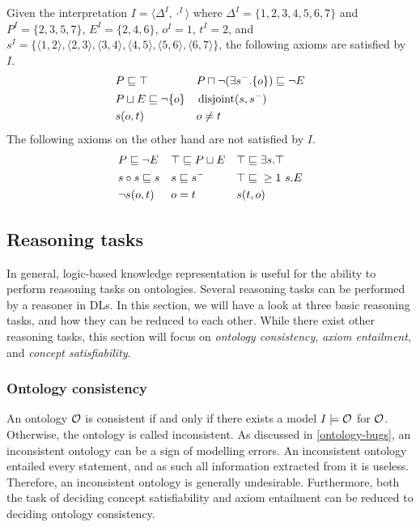 \begin{example}
  Given the interpretation $I = \langle \Delta^I, \cdot^I \rangle$ where $\Delta^I = \{ 1, 2, 3, 4, 5, 6, 7 \}$ and $P^I = \{ 2, 3, 5, 7 \}$, $E^I = \{ 2, 4, 6 \}$, $o^I = 1$, $t^I = 2$, and $s^I = \{ \langle 1, 2 \rangle,\allowbreak \langle 2, 3 \rangle,\allowbreak \langle 3, 4 \rangle,\allowbreak \langle 4, 5 \rangle,\allowbreak \langle 5, 6 \rangle,\allowbreak \langle 6, 7 \rangle \}$, the following axioms are satisfied by $I$.
  \begin{align*}
    &P \sqsubseteq \top &
    &P \sqcap \lnot (\exists s^-.\{o\}) \sqsubseteq \lnot E \\
    &P \sqcup E \sqsubseteq \lnot \{o\} &
    &\operatorname{disjoint}(s, s^-) \\
    &s(o, t) &
    &o \not= t
  \end{align*}
  The following axioms on the other hand are not satisfied by $I$.
  \begin{align*}
    &P \sqsubseteq \lnot E &
    &\top \sqsubseteq P \sqcup E &
    &\top \sqsubseteq \exists s.\top \\
    &s \circ s \sqsubseteq s &
    &s \sqsubseteq s^- &
    &\top \sqsubseteq{} \geq 1~s.E \\
    &\lnot s(o, t) &
    &o = t &
    &s(t, o)
  \end{align*}
\end{example}

\subsection{Reasoning tasks} \label{reasoning-tasks}

In general, logic-based knowledge representation is useful for the ability to perform reasoning tasks on ontologies. Several reasoning tasks can be performed by a reasoner in DLs. In this section, we will have a look at three basic reasoning tasks, and how they can be reduced to each other. While there exist other reasoning tasks, this section will focus on \emph{ontology consistency}, \emph{axiom entailment}, and \emph{concept satisfiability}.

\subsubsection{Ontology consistency} \label{knowledge-base-satisfiability}

An ontology $\mathcal{O}$ is consistent if and only if there exists a model $I \models \mathcal{O}$ for $\mathcal{O}$. Otherwise, the ontology is called inconsistent. As discussed in \cref{ontology-bugs}, an inconsistent ontology can be a sign of modelling errors. An inconsistent ontology entailed every statement, and as such all information extracted from it is useless. Therefore, an inconsistent ontology is generally undesirable. Furthermore, both the task of deciding concept satisfiability and axiom entailment can be reduced to deciding ontology consistency.

